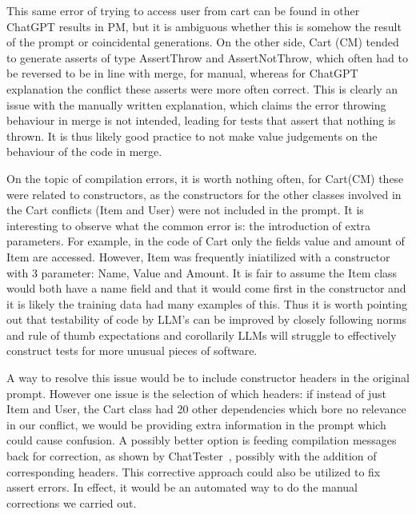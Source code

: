 This same error of trying to access user from cart can be found in other ChatGPT results in PM, but it is ambiguous
whether this is somehow the result of the prompt or coincidental generations. On the other side, Cart (CM) tended to generate
asserts of type AssertThrow and AssertNotThrow, which often had to be reversed to be in line with merge, for manual, whereas for
ChatGPT explanation the conflict these asserts were more often correct. This is clearly an issue with the manually written explanation,
which claims the error throwing behaviour in merge is not intended, leading for tests that assert that nothing is thrown.
It is thus likely good practice to not make value judgements on the behaviour of the code in merge.

On the topic of compilation errors, it is worth nothing often, for Cart(CM) these were related to constructors, as the constructors
for the other classes involved in the Cart conflicts (Item and User) were not included in the prompt. It is interesting
to observe what the common error is: the introduction of extra parameters. For example, in the code of Cart only the fields
value and amount of Item are accessed. However, Item was frequently iniatilized with a constructor with 3 parameter: Name,
Value and Amount. It is fair to assume the Item class would both have a name field and that it would come first in the constructor
and it is likely the training data had many examples of this. Thus it is worth pointing out that testability of code by LLM's can be
improved by closely following norms and rule of thumb expectations and corollarily LLMs will struggle to effectively construct tests
for more unusual pieces of software.

A way to resolve this issue would be to include constructor headers in the original prompt. However one issue is the selection of which
headers: if instead of just Item and User, the Cart class had 20 other dependencies which bore no relevance in our conflict, we would be 
providing extra information in the prompt which could cause confusion. A possibly better option is feeding compilation messages back for correction,
as shown by ChatTester~\cite{kn:chattester}, possibly with the addition of corresponding headers. This corrective approach could also be utilized
to fix assert errors. In effect, it would be an automated way to do the manual corrections we carried out.

